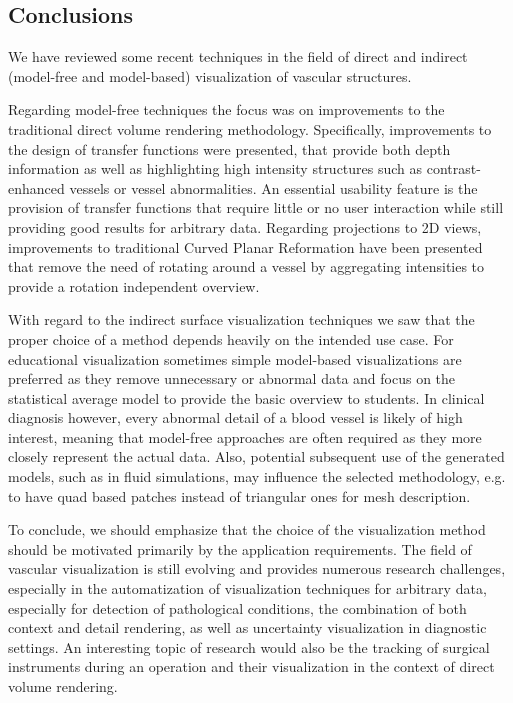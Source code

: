 \subsection{Conclusions}

We have reviewed some recent techniques in the field of direct and indirect (model-free and model-based) visualization of vascular structures. 

Regarding model-free techniques the focus was on improvements to the traditional direct volume rendering methodology. Specifically, improvements to the design of transfer functions were presented, that provide both depth information as well as highlighting high intensity structures such as contrast-enhanced vessels or vessel abnormalities. An essential usability feature is the provision of transfer functions that require little or no user interaction while still providing good results for arbitrary data.
Regarding projections to 2D views, improvements to traditional Curved Planar Reformation have been presented that remove the need of rotating around a vessel by aggregating intensities to provide a rotation independent overview.

With regard to the indirect surface visualization techniques we saw that the proper choice of a method depends heavily on the intended use case. For educational visualization sometimes simple model-based visualizations are preferred as they remove unnecessary or abnormal data and focus on the statistical average model to provide the basic overview to students. In clinical diagnosis however, every abnormal detail of a blood vessel is likely of high interest, meaning that model-free approaches are often required as they more closely represent the actual data. Also, potential subsequent use of the generated models, such as in fluid simulations, may influence the selected methodology, e.g. to have quad based patches instead of triangular ones for mesh description.

To conclude, we should emphasize that the choice of the visualization method should be motivated primarily by the application requirements.
The field of vascular visualization is still evolving and provides numerous research challenges, especially in the automatization of visualization techniques for arbitrary data, especially for detection of pathological conditions, the combination of both context and detail rendering, as well as uncertainty visualization in diagnostic settings. An interesting topic of research would also be the tracking of surgical instruments during an operation and their visualization in the context of direct volume rendering.